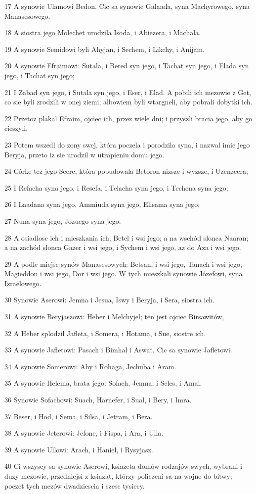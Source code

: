 \par 17 A synowie Ulamowi Bedon. Cic sa synowie Galaada, syna Machyrowego, syna Manasesowego.
\par 18 A siostra jego Molechet urodzila Isoda, i Abiezera, i Machala.
\par 19 A synowie Semidowi byli Ahyjan, i Sechem, i Likchy, i Anijam.
\par 20 A synowie Efraimowi: Sutala, i Bered syn jego, i Tachat syn jego, i Elada syn jego, i Tachat syn jego;
\par 21 I Zabad syn jego, i Sutala syn jego, i Eser, i Elad. A pobili ich mezowie z Get, co sie byli zrodzili w onej ziemi; albowiem byli wtargneli, aby pobrali dobytki ich.
\par 22 Przetoz plakal Efraim, ojciec ich, przez wiele dni; i przyszli bracia jego, aby go cieszyli.
\par 23 Potem wszedl do zony swej, która poczela i porodzila syna, i nazwal imie jego Beryja, przeto iz sie urodzil w utrapieniu domu jego.
\par 24 Córke tez jego Seere, która pobudowala Betoron nizsze i wyzsze, i Uzenzeera;
\par 25 I Refacha syna jego, i Resefa, i Telacha syna jego, i Techena syna jego;
\par 26 I Laadana syna jego, Ammiuda syna jego, Elisama syna jego;
\par 27 Nuna syna jego, Jozuego syna jego.
\par 28 A osiadlosc ich i mieszkania ich, Betel i wsi jego; a na wschód slonca Naaran; a na zachód slonca Gazer i wsi jego, i Sychem i wsi jego, az do Aza i wsi jego.
\par 29 A podle miejsc synów Manasesowych: Betsan, i wsi jego, Tanach i wsi jego, Magieddon i wsi jego, Dor i wsi jego. W tych mieszkali synowie Józefowi, syna Izraelowego.
\par 30 Synowie Aserowi: Jemna i Jesua, Iswy i Beryja, i Sera, siostra ich.
\par 31 A synowie Beryjaszowi: Heber i Melchyjel; ten jest ojciec Birsawitów,
\par 32 A Heber splodzil Jafleta, i Somera, i Hotama, i Sue, siostre ich.
\par 33 A synowie Jafletowi: Pasach i Bimhal i Aswat. Cic sa synowie Jafletowi.
\par 34 A synowie Somerowi: Ahy i Rohaga, Jechuba i Aram.
\par 35 A synowie Helema, brata jego: Sofach, Jemna, i Seles, i Amal.
\par 36 Synowie Sofachowi: Suach, Harnefer, i Sual, i Bery, i Imra.
\par 37 Beser, i Hod, i Sema, i Silsa, i Jetram, i Bera.
\par 38 A synowie Jeterowi: Jefone, i Fispa, i Ara, i Ulla.
\par 39 A synowie Ullowi: Arach, i Haniel, i Rysyjasz.
\par 40 Ci wszyscy sa synowie Aserowi, ksiazeta domów rodzajów swych, wybrani i duzy mezowie, przedniejsi z ksiazat, którzy policzeni sa na wojne do bitwy; poczet tych mezów dwadziescia i szesc tysiecy.


